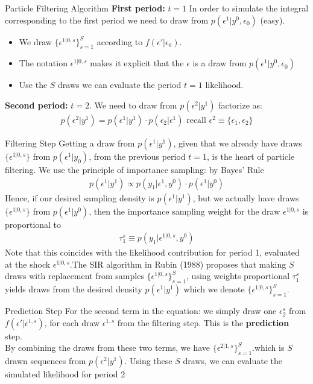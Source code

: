 \documentclass[xcolor=pdftex,dvipsnames,table,mathserif,aspectratio=169]{beamer}
\begin{document}
\begin{frame}{Particle Filtering Algorithm}
\textbf{First period:} $t=1$ In order to simulate the integral corresponding to the first period we need to draw from $p(\epsilon^1 | y^0,\epsilon_0)$ (easy).  
\begin{itemize}
\item We draw $\{\epsilon^{1|0,s }\}_{s=1}^S$ according to $f(\epsilon' | \epsilon_0)$.
\item The notation $\epsilon^{1|0,s}$ makes it explicit that the $\epsilon$ is a draw from $p(\epsilon^1 | y^0,\epsilon_0)$
\item Use the $S$ draws we can evaluate the period $t=1$ likelihood.
\end{itemize}
\textbf{Second period:} $t=2$. We need to draw from $p(\epsilon^2 | y^1)$ factorize as:
\begin{eqnarray*}
p(\epsilon^2 | y^1) = p(\epsilon^1 | y^1) \cdot p(\epsilon_2 | \epsilon^1) \mbox{ recall } \epsilon^2 \equiv \{\epsilon_1,\epsilon_2\}
\end{eqnarray*}
\end{frame}

\begin{frame}{Filtering Step}
Getting a draw from $p(\epsilon^1| y^1)$, given that we already have draws $\{\epsilon^{1|0,s} \}$ from $p(\epsilon^1 | y_0)$, from the previous period $t = 1$, is the heart of particle filtering. We use the principle of importance sampling: by Bayes' Rule
\begin{eqnarray*}
p(\epsilon^1 | y^1) \propto p(y_1 | \epsilon^1, y^0) \cdot p (\epsilon^1 | y^0)
\end{eqnarray*}
Hence, if our desired sampling density is $p(\epsilon^1 | y^1)$, but we actually have draws $\{ \epsilon^{1|0,s}\}$ from $p(\epsilon^1| y^0)$, then the importance sampling weight for the draw
 $\epsilon^{1|0,s}$ is proportional to
\begin{eqnarray*}
\tau_1^s \equiv p(y_1 | \epsilon^{1|0,s},y^0)
\end{eqnarray*}
Note that this coincides with the likelihood contribution for period 1, evaluated at the shock $\epsilon^{1|0,s}$.The SIR algorithm in Rubin (1988) proposes that making $S$ draws with replacement from samples $\{ \epsilon^{1|0,s}\}_{s=1}^S$, using weights proportional $\tau_1^s$ yields draws from the desired density $p(\epsilon^1 | y^1)$ which we denote $\{ \epsilon^{1|0,s}\}_{s=1}^S$.
\end{frame}

\begin{frame}{Prediction Step}
For the second term in the equation: we simply draw one $\epsilon_2^s$ from $f(\epsilon' | \epsilon^{1,s})$, for each draw $\epsilon^{1,s}$ from the filtering step. This is the \textbf{prediction} step.\\
\vspace{0.25cm}
By combining the draws from these two terms, we have $\{ \epsilon^{2|1,s}\}_{s=1}^S$.which is $S$ drawn sequences from $p(\epsilon^2 | y^1)$. Using these $S$ draws, we can evaluate the simulated likelihood for period 2
\end{frame}
\end{document}
